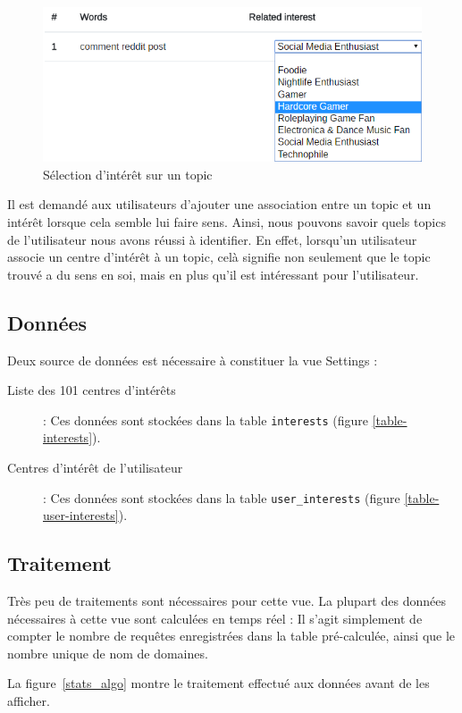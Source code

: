 		\begin{figure}[!h]
			\centering
			\includegraphics[height=0.32\textwidth]{images/results/choice}
			\caption{Sélection d'intérêt sur un topic}
			\label{choice}
		\end{figure}

		Il est demandé aux utilisateurs d'ajouter une association entre un topic et un intérêt lorsque cela semble lui faire sens. Ainsi, nous pouvons savoir quels topics de l'utilisateur nous avons réussi à identifier. En effet, lorsqu'un utilisateur associe un centre d'intérêt à un topic, celà signifie non seulement que le topic trouvé a du sens en soi, mais en plus qu'il est intéressant pour l'utilisateur.

	\subsection{Données}

		Deux source de données est nécessaire à constituer la vue Settings :
		\begin{description}
			\item[Liste des 101 centres d'intérêts] : Ces données sont stockées dans la table \texttt{interests} (figure \ref{table-interests}).
			\item[Centres d'intérêt de l'utilisateur] : Ces données sont stockées dans la table \texttt{user\_interests} (figure \ref{table-user-interests}).
		\end{description}

	\subsection{Traitement}

		Très peu de traitements sont nécessaires pour cette vue. La plupart des données nécessaires à cette vue sont calculées en temps réel : Il s'agit simplement de compter le nombre de requêtes enregistrées dans la table pré-calculée, ainsi que le nombre unique de nom de domaines.

		La figure~\ref{stats_algo} montre le traitement effectué aux données avant de les afficher.

